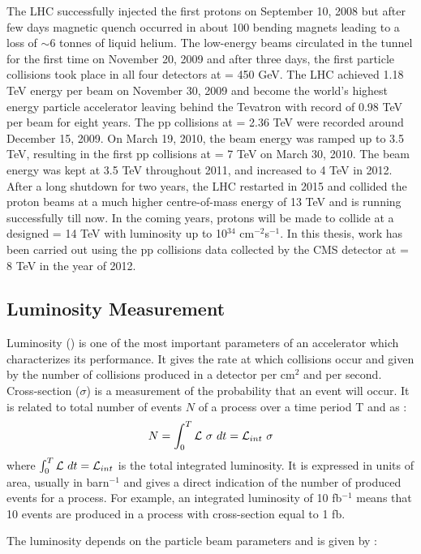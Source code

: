 The LHC successfully injected the first protons on September 10, 2008 but after few days magnetic quench occurred in about 100 bending magnets leading to a loss of $\sim$6 tonnes of liquid helium. The low-energy beams circulated in the tunnel for the first time on November 20, 2009 and after three days, the first particle collisions took place in all four detectors at \cme = 450 GeV. The LHC achieved 1.18 TeV energy per beam on November 30, 2009 and become the world’s highest energy particle accelerator leaving behind the Tevatron with record of 0.98 TeV per beam for eight years. The pp collisions at \cme = 2.36 TeV were recorded around December 15, 2009. On March 19, 2010, the beam energy was ramped up to 3.5 TeV, resulting in the first pp collisions at \cme = 7 TeV on March 30, 2010. The beam energy was kept at 3.5 TeV throughout 2011, and increased to 4 TeV in 2012. After a long shutdown for two years, the LHC restarted in 2015 and collided the proton beams at a much higher centre-of-mass energy of 13 TeV and is running successfully till now. In the coming years, protons will be made to collide at a designed \cme = 14 TeV with luminosity up to 10$^{34}$ cm$^{-2}$s$^{-1}$. In this thesis, work has been carried out using the pp collisions data collected by the CMS detector at \cme = 8 TeV in the year of 2012.

\subsection{Luminosity Measurement}
\label{sec:lumi}
Luminosity (\lumi) is one of the most important parameters of an accelerator which characterizes its performance. It gives the rate at which collisions occur and given by the number of collisions produced in a detector per cm$^2$ and per second. Cross-section ($\sigma$) is a measurement of the probability that an event will occur. It is related to total number of events $N$ of a process over a time period T and \lumi as :
\begin{equation}
N = \int_{0}^{T} \mathcal{L}~\sigma~dt = \mathcal{L}_{int}~\sigma
\end{equation}
where $\int_{0}^{T} \mathcal{L}~dt = \mathcal{L}_{int}$ is the total integrated luminosity. It is expressed in units of area, usually in barn$^{-1}$ and gives a direct indication of the number of produced events for a process. For example, an integrated luminosity of 10 fb$^{-1}$ means that 10 events are produced in a process with cross-section equal to 1 fb.

The luminosity depends on the particle beam parameters and is given by :

